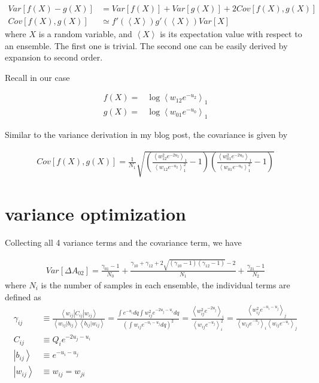 \documentclass[notitlepage, amsmath, amssymb, aps]{revtex4-1}
\begin{document}
\begin{align}
Var[f(X)-g(X)] &= Var[f(X)] + Var[g(X)] + 2Cov[f(X), g(X)] \\
Cov[f(X), g(X)] &\simeq f'(\left<X\right>)g'(\left<X\right>) Var[X]
\end{align}
where $X$ is a random variable, and $\left<X\right>$ is its expectation value with respect to an ensemble.
The first one is trivial. The second one can be easily derived by expansion to second order.

Recall in our case

\begin{align}
f(X) =& \log\left<w_{12} e^{-u_2}\right>_1 \\
g(X) =& \log\left<w_{01}e^{-u_0}\right>_1
\end{align}

Similar to the variance derivation in my blog post, the covariance is given by

\begin{align}
Cov[f(X), g(X)] = \frac{1}{N_1}\sqrt{\left(\frac{\left<w_{12}^2 e^{-2u_2}\right>_1 }{\left<w_{12} e^{-u_2}\right>_1^2 } - 1\right)
        \left(\frac{\left<w_{01}^2e^{-2u_0}\right>_1}{\left<w_{01}e^{-u_0}\right>_1^2} - 1\right)}
\end{align}


\section{variance optimization}

Collecting all 4 variance terms and the covariance term, we have

\begin{align}
    Var[\Delta A_{02}] = \frac{\gamma_{01}-1}{N_0}
                        + \frac{\gamma_{10} + \gamma_{12} +2\sqrt{\left(\gamma_{10} - 1\right)\left(\gamma_{12} - 1\right)} -2}{N_1}
                        + \frac{\gamma_{21}-1}{N_2}
    \label{eq:var_02}
\end{align}
where $N_i$ is the number of samples in each ensemble, the individual terms are defined as
\begin{align}
\gamma_{ij} &\equiv \frac{\left<w_{ij}|C_{ij}|w_{ij}\right>}{\left<w_{ij}|b_{ij}\right>\left<b_{ij}|w_{ij}\right>}
     = \frac{\int e^{-u_i}dq\int w_{ij}^2e^{-2u_j - u_i}dq}{\left(\int w_{ij}e^{-u_i-u_j}dq\right)^2}
     = \frac{\left<w^2_{ij}e^{-2u_j}\right>_i}{\left<w_{ij}e^{-u_j} \right>_i^2}
     = \frac{\left<w^2_{ij}e^{-u_i-u_j}\right>_j}{\left<w_{ij}e^{-u_j} \right>_i\left<w_{ij}e^{-u_i} \right>_j} \\
C_{ij} &\equiv Q_i e^{-2u_j - u_i} \\
\left|b_{ij} \right> &\equiv e^{-u_i - u_j} \\
\left|w_{ij} \right> &\equiv w_{ij} = w_{ji}
\end{align}
\end{document}
